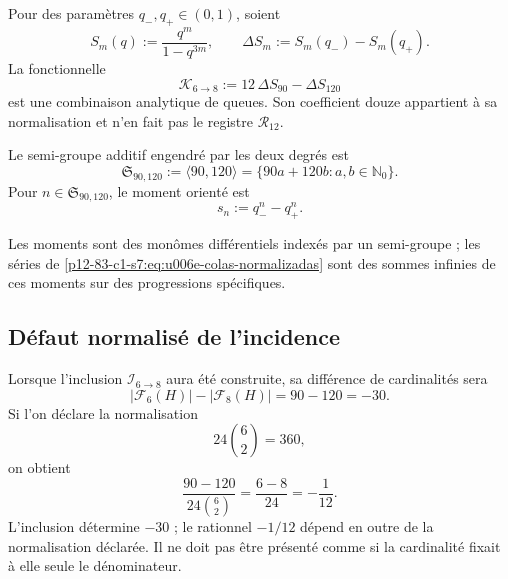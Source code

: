 {\begin{definition}
\label{p12-83-c1-s7:def:u006e-combinacion-colas}
Pour des paramètres \(q_-,q_+\in(0,1)\), soient
\begin{equation}
 S_m(q):=\frac{q^m}{1-q^{3m}},
 \qquad
 \Delta S_m:=S_m(q_-)-S_m(q_+).
 \label{p12-83-c1-s7:eq:u006e-colas-normalizadas}
\end{equation}
La fonctionnelle
\begin{equation}
 \mathcal K_{6\to8}
 :=12\,\Delta S_{90}-\Delta S_{120}
 \label{p12-83-c1-s7:eq:u006e-funcional-seis-ocho}
\end{equation}
est une combinaison analytique de queues. Son coefficient douze appartient à sa
normalisation et n’en fait pas le registre
\(\mathcal R_{12}\).
\end{definition}

\begin{definition}
\label{p12-83-c1-s7:def:u006e-semigrupo-momentos}
Le semi-groupe additif engendré par les deux degrés est
\begin{equation}
 \mathfrak S_{90,120}
 :=\langle90,120\rangle
 =\{90a+120b:a,b\in\mathbb N_0\}.
 \label{p12-83-c1-s7:eq:u006e-semigrupo}
\end{equation}
Pour \(n\in\mathfrak S_{90,120}\), le moment orienté est
\begin{equation}
 s_n:=q_-^n-q_+^n.
 \label{p12-83-c1-s7:eq:u006e-momento}
\end{equation}
\end{definition}

Les moments sont des monômes différentiels indexés par un semi-groupe ; les
séries de \eqref{p12-83-c1-s7:eq:u006e-colas-normalizadas} sont des sommes infinies de ces
moments sur des progressions spécifiques.

\subsection{Défaut normalisé de l’incidence}

Lorsque l’inclusion \(\mathcal I_{6\to8}\) aura été construite, sa
différence de cardinalités sera
\[
 |\mathcal F_6(H)|-|\mathcal F_8(H)|=90-120=-30.
\]
Si l’on déclare la normalisation
\[
 24\binom62=360,
\]
on obtient
\begin{equation}
 \frac{90-120}{24\binom62}
 =\frac{6-8}{24}
 =-\frac1{12}.
 \label{p12-83-c1-s7:eq:u006e-defecto-normalizado}
\end{equation}
L’inclusion détermine \(-30\) ; le rationnel \(-1/12\) dépend en outre de
la normalisation déclarée. Il ne doit pas être présenté comme si la cardinalité
fixait à elle seule le dénominateur.

}
